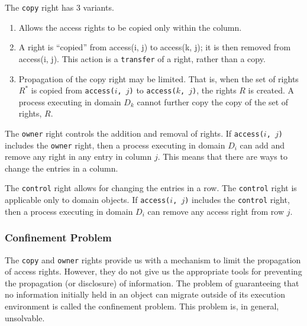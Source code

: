 The \texttt{copy} right has 3 variants.
\begin{enumerate}[noitemsep]
\item Allows the access rights to be copied only within the column.
\item A right is ``copied'' from access(i, j) to access(k, j); it is then removed from access(i, j).
  This action is a \texttt{transfer} of a right, rather than a copy.
\item Propagation of the copy right may be limited.
  That is, when the set of rights $R^{*}$ is copied from \texttt{access($i$, $j$)} to \texttt{access($k$, $j$)},  the rights $R$ is created.
  A process executing in domain $D_{k}$ cannot further copy the copy of the set of rights, $R$.
\end{enumerate}

The \texttt{owner} right controls the addition and removal of rights.
If \texttt{access($i$, $j$)} includes the \texttt{owner} right, then a process executing in domain $D_{i}$ can add and remove any right in any entry in column $j$.
This means that there are ways to change the entries in a column.

The \texttt{control} right allows for changing the entries in a row.
The \texttt{control} right is applicable only to domain objects.
If \texttt{access($i$, $j$)} includes the \texttt{control} right, then a process executing in domain $D_{i}$ can remove any access right from row $j$.

\subsubsection{Confinement Problem}\label{subsubsec:Confinement_Problem}
The \texttt{copy} and \texttt{owner} rights provide us with a mechanism to limit the propagation of access rights.
However, they do not give us the appropriate tools for preventing the propagation (or disclosure) of information.
The problem of guaranteeing that no information initially held in an object can migrate outside of its execution environment is called the confinement problem.
This problem is, in general, unsolvable.

